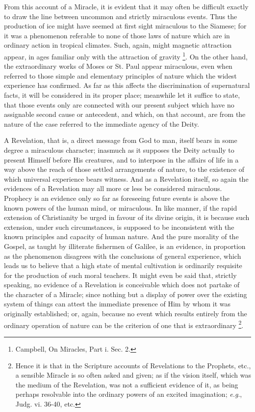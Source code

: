 From this account of a Miracle, it is evident
that it may often be difficult exactly to draw the line between
uncommon and strictly miraculous events. Thus the production of ice
might have seemed at first sight miraculous to the Siamese; for it was
a phenomenon referable to none of those laws of nature which are in
ordinary action in tropical climates. Such, again, might magnetic
attraction appear, in ages familiar only with the attraction of
gravity \footnote{Campbell, On Miracles, Part i. Sec. 2.}. On the other
hand, the extraordinary works of Moses or St. Paul appear miraculous,
even when referred to those simple and elementary principles of nature
which the widest experience has confirmed. As far as this affects the
discrimination of supernatural facts, it will be considered in its
proper place; meanwhile let it suffice to state, that those events
only are connected with our present subject which have no assignable
second cause or antecedent, and which, on that account, are from the
nature of the case referred to the immediate agency of the Deity.

A Revelation, that is, a direct message from God
to man, itself bears in some degree a miraculous character; inasmuch
as it supposes the Deity actually to present Himself before His
creatures, and to interpose in the affairs of life in a way above the
reach of those settled arrangements of nature, to the existence of
which universal experience bears witness. And as a Revelation itself,
so again the evidences of a Revelation may all more or less be
considered miraculous. Prophecy is an evidence only so far as
foreseeing future events is above the known powers of the human mind,
or miraculous. In like manner, if the rapid extension of Christianity
be urged in favour of its divine origin, it is because such extension,
under such circumstances, is supposed to be inconsistent with the
known principles and capacity of human nature. And the pure morality
of the Gospel, as taught by illiterate fishermen of Galilee, is an
evidence, in proportion as the phenomenon disagrees with the
conclusions of general experience, which leads us to believe that a
high state of mental cultivation is ordinarily requisite for the
production of such moral teachers. It might even be said that,
strictly speaking, no evidence of a Revelation is conceivable which
does not partake of the character of a Miracle; since nothing but a
display of power over the existing system of things can attest the
immediate presence of Him by whom it was originally established; or,
again, because no event which results entirely from the ordinary
operation of nature can be the criterion of one that is extraordinary
\footnote{Hence it is that in the Scripture accounts of Revelations to the
Prophets, etc., a sensible Miracle is so often asked and given; as if
the vision itself, which was the medium of the Revelation, was not a
sufficient evidence of it, as being perhaps resolvable into the
ordinary powers of an excited imagination; \emph{e.g}., Judg. vi.
36-40, etc.}.

